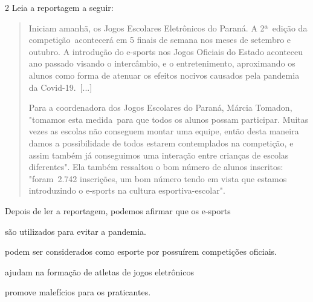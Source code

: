 
\num{2}  Leia a reportagem a seguir:

\begin{quote}
Iniciam amanhã, os Jogos Escolares Eletrônicos do Paraná. A 2ª~edição da
competição~acontecerá em 5 finais de semana nos meses de setembro e
outubro. A introdução do e-sports nos Jogos Oficiais do Estado aconteceu
ano passado visando o intercâmbio, e o entretenimento, aproximando os
alunos como forma de atenuar os efeitos nocivos causados pela pandemia
da Covid-19.~{[}...{]}

Para a coordenadora dos Jogos Escolares do Paraná, Márcia Tomadon,
"tomamos esta medida~para que todos os alunos possam participar. Muitas
vezes as escolas não conseguem montar uma equipe, então desta maneira
damos a possibilidade de todos estarem contemplados na competição, e
assim também já conseguimos uma interação entre crianças de escolas
diferentes". Ela também ressaltou o bom número de alunos inscritos:
"foram~2.742 inscrições, um bom número tendo em vista que estamos
introduzindo o e-sports na cultura esportiva-escolar".~

\end{quote}

Depois de ler a reportagem, podemos afirmar que os e-sports

\begin{escolha}
\item são utilizados para evitar a pandemia.

\item podem ser considerados como esporte por possuírem competições
oficiais.

\item ajudam na formação de atletas de jogos eletrônicos

\item promove malefícios para os praticantes.
\end{escolha}

